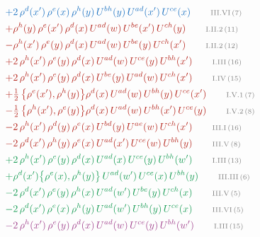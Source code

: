 \documentclass[10pt]{article}
\begin{document}
\begin{align}
&\qquad{\color{RoyalBlue}+2\,\rho^{d}(x')\,\rho^{e}(x)\, \rho^{h}(y)\,U^{bh}(y)\,U^{ad}(x')\,U^{ce}(x)}\tag*{\color{gray}\scriptsize III.VI\,(7)}\\
&\qquad{\color{BrickRed}+\rho^{h}(y)\,\rho^{e}(x')\,\rho^{d}(x)\,U^{ad}(w)\,U^{be}(x')\,U^{ch}(y)}\tag*{\color{gray}\scriptsize I.II.2\,(11)}\\
&\qquad{\color{BrickRed}-\rho^{h}(x')\,\rho^{e}(y)\,\rho^{d}(x)\,U^{ad}(w)\,U^{be}(y)\,U^{ch}(x')}\tag*{\color{gray}\scriptsize I.II.2\,(12)}\\
&\qquad{\color{BrickRed}+2\,\rho^{h}(x')\,\rho^{e}(y)\,\rho^{d}(x)\,U^{ad}(w)\,U^{ce}(y)\,U^{bh}(x')}\tag*{\color{gray}\scriptsize I.III\,(16)}\\
&\qquad{\color{BrickRed}+2\,\rho^{h}(x')\,\rho^{e}(y)\,\rho^{d}(x)\,U^{be}(y)\,U^{ad}(w)\,U^{ch}(x')}\tag*{\color{gray}\scriptsize I.IV\,(15)}\\
&\qquad{\color{BrickRed}+\tfrac{1}{2}\,\big\{\rho^{e}(x'),\rho^{h}(y)\big\}\rho^{d}(x)\,U^{ad}(w)\,U^{bh}(y)\,U^{ce}(x')}\tag*{\color{gray}\scriptsize I.V.1\,(7)}\\
&\qquad{\color{BrickRed}-\tfrac{1}{2}\,\big\{\rho^{h}(x'),\rho^{e}(y)\big\}\rho^{d}(x)\,U^{ad}(w)\,U^{bh}(x')\,U^{ce}(y)}\tag*{\color{gray}\scriptsize I.V.2\,(8)}\\
&\qquad{\color{BrickRed}-2\,\rho^{h}(x')\,\rho^{d}(y)\,\rho^{e}(x)\,U^{bd}(y)\,U^{ae}(w)\,U^{ch}(x')}\tag*{\color{gray}\scriptsize III.I\,(16)}\\
&\qquad{\color{BrickRed}-2\,\rho^{d}(x')\,\rho^{h}(y)\, \rho^{e}(x)\,U^{ad}(x')\,U^{ce}(w)\,U^{bh}(y)}\tag*{\color{gray}\scriptsize III.V\,(8)}\\
&\qquad{\color{ForestGreen}+2\,\rho^{h}(x')\,\rho^{e}(y)\,\rho^{d}(x)\,U^{ad}(x)\,U^{ce}(y)\,U^{bh}(w')}\tag*{\color{gray}\scriptsize I.III\,(13)}\\
&\qquad{\color{ForestGreen}+\rho^{d}(x')\big\{\rho^{e}(x),\rho^{h}(y)\big\}\,U^{ad}(w')\,U^{ce}(x)\,U^{bh}(y)}\tag*{\color{gray}\scriptsize III.III\,(6)}\\
&\qquad{\color{ForestGreen}-2\,\rho^{d}(x')\,\rho^{e}(y)\, \rho^{h}(x)\,U^{ad}(w')\,U^{be}(y)\,U^{ch}(x)}\tag*{\color{gray}\scriptsize III.V\,(5)}\\
&\qquad{\color{ForestGreen}-2\,\rho^{d}(x')\,\rho^{e}(x)\, \rho^{h}(y)\,U^{ad}(w')\,U^{bh}(y)\,U^{ce}(x)}\tag*{\color{gray}\scriptsize III.VI\,(5)}\\
&\qquad{\color{DarkOrchid}-2\,\rho^{h}(x')\,\rho^{e}(y)\,\rho^{d}(x)\,U^{ad}(w)\,U^{ce}(y)\,U^{bh}(w')}\tag*{\color{gray}\scriptsize I.III\,(15)}\\

\end{align}
\end{document}
